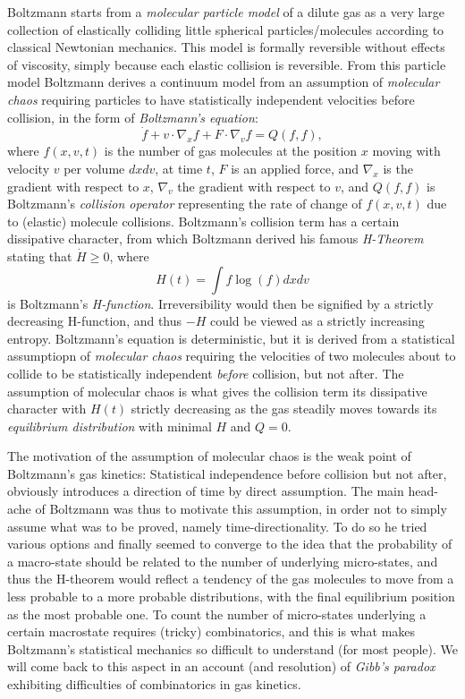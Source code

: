Boltzmann starts from a \emph{molecular particle model}
of a dilute gas as a very large collection of elastically colliding little
spherical particles/molecules according to classical Newtonian mechanics.
This model is formally reversible without effects of viscosity, simply
because each elastic collision is reversible. 
From this particle model Boltzmann derives a continuum model
from an assumption of \emph{molecular chaos} requiring particles to 
have statistically independent velocities before
collision, in the form of \emph{Boltzmann's equation}:
\begin{equation}\label{boltzmann}
\dot f +v\cdot\nabla_xf +F\cdot\nabla_vf =Q(f,f),
\end{equation}
where $f (x,v,t)$ is the number of gas molecules at the position
$x$ moving with velocity $v$ per volume $dxdv$,
at time $t$, $F$ is an applied force, and 
$\nabla_x$ is the gradient with respect to $x$, $\nabla_v$
the gradient with respect to $v$, and  
$Q(f,f)$ is Boltzmann's \emph{collision operator} representing
the rate of change of $f(x,v,t)$ due to (elastic) molecule collisions. 
Boltzmann's collision term has
a certain dissipative character, from which Boltzmann derived his
famous \emph{H-Theorem} stating that $\dot H\ge 0$, where
\[
H(t)=\int f\log(f )dxdv
\]   
is Boltzmann's \emph{H-function}. Irreversibility would then
be signified by a strictly decreasing H-function, and thus $-H$
could be viewed as a strictly increasing entropy. 
Boltzmann's equation is deterministic,
but it is derived from a statistical assumptiopn of \emph{molecular chaos} 
requiring the velocities of two molecules about to collide 
to be statistically independent \emph{before} collision, but not after. 
The assumption
of molecular chaos is what gives the collision term its dissipative 
character with $H(t)$ strictly decreasing as the gas steadily moves
towards its \emph{equilibrium distribution} with minimal $H$
and $Q=0$.

The motivation of the assumption of molecular chaos is the weak
point of Boltzmann's gas kinetics: Statistical independence 
before collision but not after, obviously introduces a direction
of time by direct assumption. The main head-ache of Boltzmann
was thus to motivate this assumption, in order not to simply assume what
was to be proved, namely time-directionality.
 To do so he tried various
options and finally seemed to converge to the idea that the probability 
of a macro-state should be related to the number of underlying micro-states,
and thus the H-theorem would reflect a tendency of the gas molecules
to move from a less probable to a more probable distributions,
with the final equilibrium position as the most probable one. To count 
the number of micro-states underlying a certain macrostate requires
(tricky) combinatorics, and this is what makes Boltzmann's statistical
mechanics so difficult to understand (for most people).
We will come back to this aspect
in an account (and resolution) of \emph{Gibb's paradox} 
exhibiting difficulties of combinatorics in gas kinetics.

